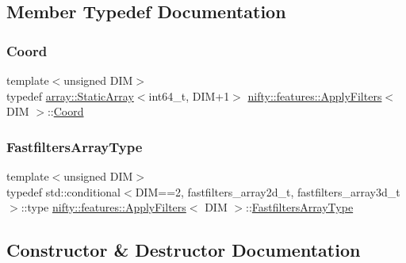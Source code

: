 \subsection{Member Typedef Documentation}
\mbox{\label{structnifty_1_1features_1_1ApplyFilters_a0a26d161f300b3394044f1357ae5ebfd}} 
\subsubsection{\texorpdfstring{Coord}{Coord}}
{\footnotesize\ttfamily template$<$unsigned D\+IM$>$ \\
typedef \hyperlink{namespacenifty_1_1array_a683f151f19c851754e0c6d55ed16a0c2}{array\+::\+Static\+Array}$<$int64\+\_\+t, D\+IM+1$>$ \hyperlink{structnifty_1_1features_1_1ApplyFilters}{nifty\+::features\+::\+Apply\+Filters}$<$ D\+IM $>$\+::\hyperlink{structnifty_1_1features_1_1ApplyFilters_a0a26d161f300b3394044f1357ae5ebfd}{Coord}}

\mbox{\label{structnifty_1_1features_1_1ApplyFilters_adfddd3f0fdaa0179cc23100901565774}} 
\subsubsection{\texorpdfstring{Fastfilters\+Array\+Type}{FastfiltersArrayType}}
{\footnotesize\ttfamily template$<$unsigned D\+IM$>$ \\
typedef std\+::conditional$<$D\+IM==2, fastfilters\+\_\+array2d\+\_\+t, fastfilters\+\_\+array3d\+\_\+t $>$\+::type \hyperlink{structnifty_1_1features_1_1ApplyFilters}{nifty\+::features\+::\+Apply\+Filters}$<$ D\+IM $>$\+::\hyperlink{structnifty_1_1features_1_1ApplyFilters_adfddd3f0fdaa0179cc23100901565774}{Fastfilters\+Array\+Type}}



\subsection{Constructor \& Destructor Documentation}
\mbox{\label{structnifty_1_1features_1_1ApplyFilters_ad851e87ed8e1ec3ba63fb11e58aa2856}} 
